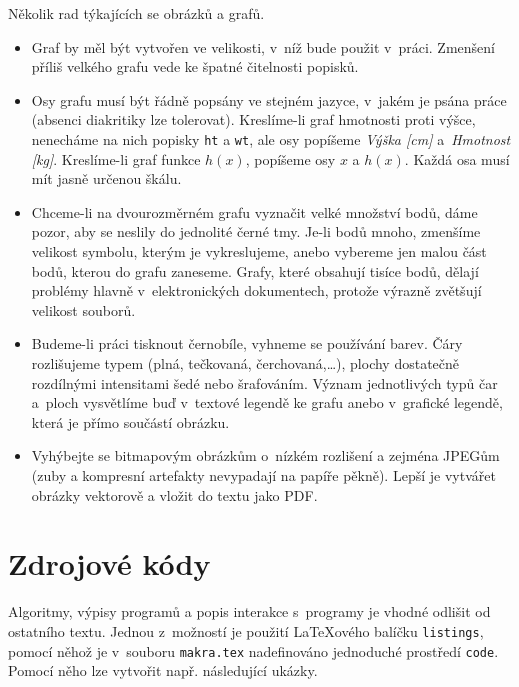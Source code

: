 Několik rad týkajících se obrázků a grafů.

\begin{itemize}
\item Graf by měl být vytvořen ve velikosti, v~níž bude použit
  v~práci. Zmenšení příliš velkého grafu vede ke špatné čitelnosti
  popisků.
\item Osy grafu musí být řádně popsány ve stejném jazyce, v~jakém je
  psána práce (absenci diakritiky lze tolerovat). Kreslíme-li graf
  hmotnosti proti výšce, nenecháme na nich popisky \texttt{ht} a
  \texttt{wt}, ale osy popíšeme \emph{Výška [cm]} a~\emph{Hmotnost
    [kg]}. Kreslíme-li graf funkce $h(x)$, popíšeme osy $x$ a $h(x)$.
  Každá osa musí mít jasně určenou škálu.
\item Chceme-li na dvourozměrném grafu vyznačit velké množství bodů,
  dáme pozor, aby se neslily do jednolité černé tmy. Je-li bodů mnoho,
  zmenšíme velikost symbolu, kterým je vykreslujeme, anebo vybereme
  jen malou část bodů, kterou do grafu zaneseme. Grafy, které obsahují
  tisíce bodů, dělají problémy hlavně v~elektronických dokumentech,
  protože výrazně zvětšují velikost souborů.
\item Budeme-li práci tisknout černobíle, vyhneme se používání barev.
  Čáry roz\-li\-šu\-je\-me typem (plná, tečkovaná, čerchovaná,\ldots), plochy
  dostatečně roz\-díl\-ný\-mi intensitami šedé nebo šrafováním. Význam
  jednotlivých typů čar a~ploch vysvětlíme buď v~textové legendě ke
  grafu anebo v~grafické legendě, která je přímo součástí obrázku.
\item Vyhýbejte se bitmapovým obrázkům o~nízkém rozlišení a zejména
  JPEGům (zuby a kompresní artefakty nevypadají na papíře pěkně).
  Lepší je vytvářet obrázky vektorově a vložit do textu jako PDF.
\end{itemize}


\section{Zdrojové kódy}
Algoritmy, výpisy programů a popis interakce s~programy je vhodné odlišit od ostatního textu. Jednou z~možností je použití {\LaTeX}o\-vé\-ho balíčku \texttt{listings}, pomocí něhož je v~souboru \texttt{makra.tex} nadefinováno jednoduché prostředí \texttt{code}. Pomocí něho lze vytvořit např. následující ukázky.


